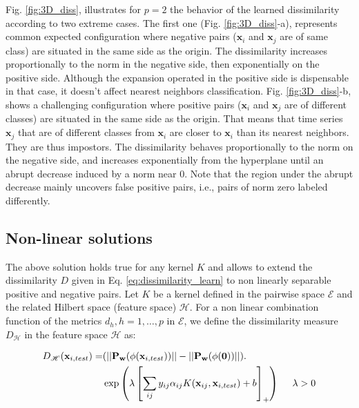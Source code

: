 Fig. \ref{fig:3D_diss}, illustrates for $p = 2$ the behavior of the learned dissimilarity according to two extreme cases. The first one (Fig. \ref{fig:3D_diss}-a), represents common expected configuration where negative pairs ($\textbf{x}_i$ and $\textbf{x}_j$ are of same class) are situated in the same side as the origin. The dissimilarity increases proportionally to the norm in the negative side, then exponentially on the positive side. Although the expansion operated in the positive side is dispensable in that case, it doesn’t affect nearest neighbors classification. Fig. \ref{fig:3D_diss}-b, shows a challenging configuration where positive pairs ($\textbf{x}_i$ and $\textbf{x}_j$ are of different classes) are situated in the same side as the origin. That means that time series $\textbf{x}_j$ that are of different classes from $\textbf{x}_i$ are closer to $\textbf{x}_i$ than its nearest neighbors. They are thus impostors. The dissimilarity behaves proportionally to the norm on the negative side, and increases exponentially from the hyperplane until an abrupt decrease induced by a norm near 0. Note that the region under the abrupt decrease mainly uncovers false positive pairs, i.e., pairs of norm zero labeled differently.

\subsection{Non-linear solutions}
The above solution holds true for any kernel $K$ and allows to extend the dissimilarity $D$ given in Eq. \ref{eq:dissimilarity_learn} to non linearly separable positive and negative pairs. Let $K$ be a kernel defined in the pairwise space $\mathcal{E}$ and the related Hilbert space (feature space) $\mathcal{H}$. For a non linear combination function of the metrics $d_h, h = 1,\ldots,p$ in $\mathcal{E}$, we define the dissimilarity measure $D_\mathcal{H}$ in the feature space $\mathcal{H}$ as:

\begin{equation}
\begin{aligned}
	D_\mathcal{H}(\textbf{x}_{i,test}) = 
	& (||\textbf{P}_\textbf{w}(\phi(\textbf{x}_{i,test}))||-||\textbf{P}_\textbf{w}(\phi(\textbf{0}))||). \\
	& \exp\left( \lambda \left[  \sum_{ij}y_{ij} \alpha_{ij} K(\textbf{x}_{ij},\textbf{x}_{i,test}) + b \right] _+\right) 
	\text{ \quad  } \lambda > 0
	\label{eq:dissimilarity_learn_NonLinear}
\end{aligned}
\end{equation}

